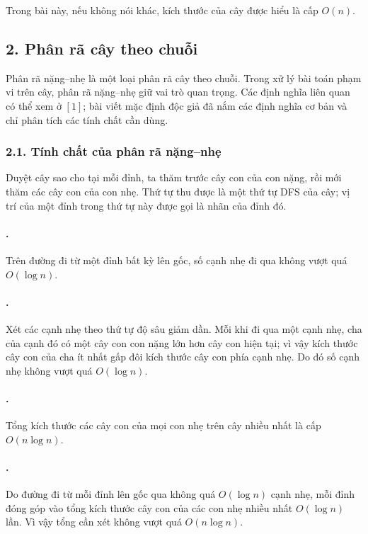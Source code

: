 \documentclass[11pt]{article}
\begin{document}
Trong bài này, nếu không nói khác, kích thước của cây được hiểu là cấp
\(O(n)\).

\subsection*{2. Phân rã cây theo chuỗi}

Phân rã nặng--nhẹ là một loại phân rã cây theo chuỗi. Trong xử lý bài toán
phạm vi trên cây, phân rã nặng--nhẹ giữ vai trò quan trọng. Các định nghĩa
liên quan có thể xem ở \([1]\); bài viết mặc định độc giả đã nắm các định nghĩa
cơ bản và chỉ phân tích các tính chất cần dùng.

\subsubsection*{2.1. Tính chất của phân rã nặng--nhẹ}

Duyệt cây sao cho tại mỗi đỉnh, ta thăm trước cây con của con nặng, rồi mới
thăm các cây con của con nhẹ. Thứ tự thu được là một thứ tự DFS của cây; vị
trí của một đỉnh trong thứ tự này được gọi là nhãn của đỉnh đó.

\paragraph{.}
Trên đường đi từ một đỉnh bất kỳ lên gốc, số cạnh nhẹ đi qua không vượt quá
\(O(\log n)\).

\paragraph{.}
Xét các cạnh nhẹ theo thứ tự độ sâu giảm dần. Mỗi khi đi qua một cạnh nhẹ,
cha của cạnh đó có một cây con con nặng lớn hơn cây con hiện tại; vì vậy kích
thước cây con của cha ít nhất gấp đôi kích thước cây con phía cạnh nhẹ. Do đó
số cạnh nhẹ không vượt quá \(O(\log n)\).

\paragraph{.}
Tổng kích thước các cây con của mọi con nhẹ trên cây nhiều nhất là cấp
\(O(n\log n)\).

\paragraph{.}
Do đường đi từ mỗi đỉnh lên gốc qua không quá \(O(\log n)\) cạnh nhẹ, mỗi đỉnh
đóng góp vào tổng kích thước cây con của các con nhẹ nhiều nhất
\(O(\log n)\) lần. Vì vậy tổng cần xét không vượt quá \(O(n\log n)\).
\end{document}
